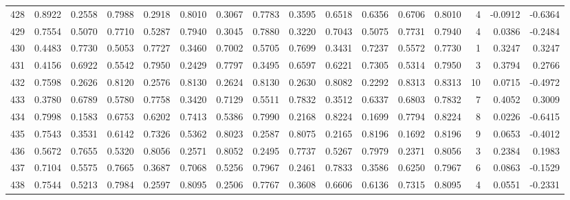 \begin{tabular}{lrrrrrrrrrrrrrrr}
428 &      0.8922 &  0.2558 &  0.7988 &  0.2918 &  0.8010 &  0.3067 &  0.7783 &  0.3595 &  0.6518 &  0.6356 &   0.6706 &     0.8010 &      4 &                   -0.0912 &                    -0.6364 \\
429 &      0.7554 &  0.5070 &  0.7710 &  0.5287 &  0.7940 &  0.3045 &  0.7880 &  0.3220 &  0.7043 &  0.5075 &   0.7731 &     0.7940 &      4 &                    0.0386 &                    -0.2484 \\
430 &      0.4483 &  0.7730 &  0.5053 &  0.7727 &  0.3460 &  0.7002 &  0.5705 &  0.7699 &  0.3431 &  0.7237 &   0.5572 &     0.7730 &      1 &                    0.3247 &                     0.3247 \\
431 &      0.4156 &  0.6922 &  0.5542 &  0.7950 &  0.2429 &  0.7797 &  0.3495 &  0.6597 &  0.6221 &  0.7305 &   0.5314 &     0.7950 &      3 &                    0.3794 &                     0.2766 \\
432 &      0.7598 &  0.2626 &  0.8120 &  0.2576 &  0.8130 &  0.2624 &  0.8130 &  0.2630 &  0.8082 &  0.2292 &   0.8313 &     0.8313 &     10 &                    0.0715 &                    -0.4972 \\
433 &      0.3780 &  0.6789 &  0.5780 &  0.7758 &  0.3420 &  0.7129 &  0.5511 &  0.7832 &  0.3512 &  0.6337 &   0.6803 &     0.7832 &      7 &                    0.4052 &                     0.3009 \\
434 &      0.7998 &  0.1583 &  0.6753 &  0.6202 &  0.7413 &  0.5386 &  0.7990 &  0.2168 &  0.8224 &  0.1699 &   0.7794 &     0.8224 &      8 &                    0.0226 &                    -0.6415 \\
435 &      0.7543 &  0.3531 &  0.6142 &  0.7326 &  0.5362 &  0.8023 &  0.2587 &  0.8075 &  0.2165 &  0.8196 &   0.1692 &     0.8196 &      9 &                    0.0653 &                    -0.4012 \\
436 &      0.5672 &  0.7655 &  0.5320 &  0.8056 &  0.2571 &  0.8052 &  0.2495 &  0.7737 &  0.5267 &  0.7979 &   0.2371 &     0.8056 &      3 &                    0.2384 &                     0.1983 \\
437 &      0.7104 &  0.5575 &  0.7665 &  0.3687 &  0.7068 &  0.5256 &  0.7967 &  0.2461 &  0.7833 &  0.3586 &   0.6250 &     0.7967 &      6 &                    0.0863 &                    -0.1529 \\
438 &      0.7544 &  0.5213 &  0.7984 &  0.2597 &  0.8095 &  0.2506 &  0.7767 &  0.3608 &  0.6606 &  0.6136 &   0.7315 &     0.8095 &      4 &                    0.0551 &                    -0.2331 \\

\end{tabular}
